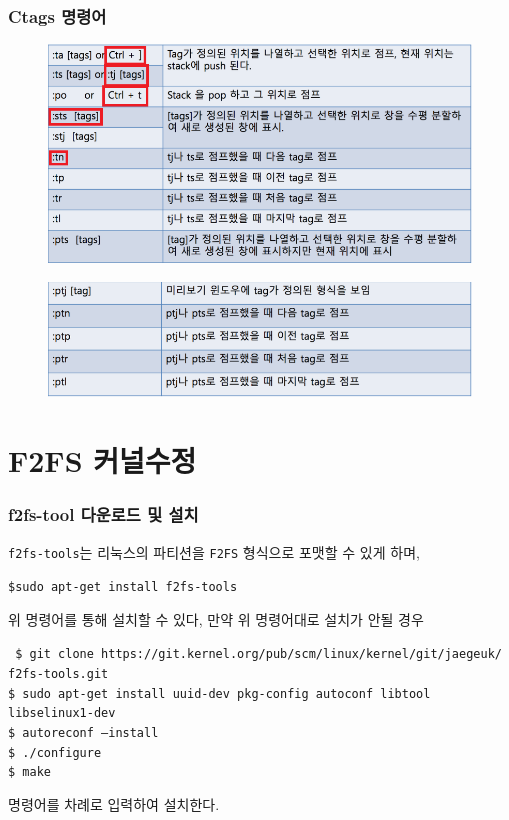\documentclass[newPxFont,sthlmFooter,nooffset]{beamer}
\begin{document}
\begin{frame}[containsverbatim,t]
  \frametitle{Ctags 명령어}
\begin{figure}[h]
\includegraphics[width=0.8\linewidth]{./figure/command3.png}
\end{figure}
\begin{figure}[h]
\includegraphics[width=0.8\linewidth]{./figure/command2.png}
\end{figure}
\end{frame}
\section{F2FS 커널수정}
\begin{frame}[containsverbatim,t]
  \frametitle{f2fs-tool 다운로드 및 설치}
\texttt{f2fs-tools}는 리눅스의 파티션을 \texttt{F2FS} 형식으로 포맷할 수 있게 하며,
\begin{mdframed}[backgroundcolor=lightgray,hidealllines=true]
\texttt{\textcolor[rgb]{0,0,0}{\$sudo apt-get install f2fs-tools}}
\end{mdframed}
\bigskip
위 명령어를 통해 설치할 수 있다, 만약 위 명령어대로 설치가 안될 경우
\begin{footnotesize}
\begin{mdframed}[backgroundcolor=lightgray,hidealllines=true]
\texttt{\textcolor[rgb]{0,0,0}{
\$ git clone https://git.kernel.org/pub/scm/linux/kernel/git/jaegeuk/\\
\smallskip
f2fs-tools.git\\
\smallskip
\$ sudo apt-get install uuid-dev pkg-config autoconf libtool libselinux1-dev\\
\smallskip
\$ autoreconf --install\\
\smallskip
\$ ./configure\\
\smallskip
\$ make}}
\end{mdframed}
\end{footnotesize}
\bigskip
명령어를 차례로 입력하여 설치한다.
\end{frame}
\end{document}
